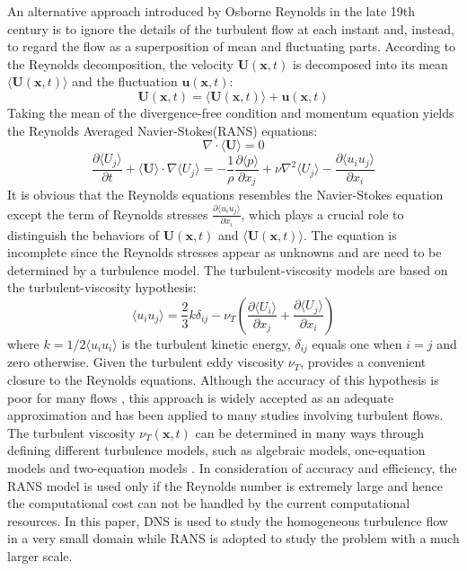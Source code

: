 An alternative approach introduced by Osborne Reynolds in the late 19th century is to ignore the details of the turbulent flow at each instant and, instead, to regard the flow as a superposition of mean and fluctuating parts. According to the Reynolds decomposition, the velocity $\mathbf{U}(\mathbf{x}, t)$ is decomposed into its mean $\langle\mathbf{U}(\mathbf{x},t)\rangle$ and the fluctuation $\mathbf{u}(\mathbf{x},t)$:
\begin{equation}
\mathbf{U}(\mathbf{x},t) = \langle\mathbf{U}(\mathbf{x},t)\rangle + \mathbf{u}(\mathbf{x},t)
\label{reynolds_decomp}
\end{equation}
Taking the mean of the divergence-free condition  and momentum equation  yields the Reynolds Averaged Navier-Stokes(RANS) equations:
\begin{equation}
\nabla\cdot\langle\mathbf{U}\rangle = 0
\label{div_free_U}
\end{equation}
\begin{equation}
\frac{\partial \langle U_j\rangle}{\partial t} + \langle \mathbf{U}\rangle
\cdot \nabla\langle U_j\rangle = 
- \frac{1}{\rho}\frac{\partial \langle p\rangle}{\partial x_j} + \nu\nabla^2\langle U_j\rangle - \frac{\partial\langle u_iu_j\rangle}{\partial x_i}
\label{reynolds_eqn}
\end{equation}
It is obvious that the Reynolds equations  resembles the Navier-Stokes equation  except the term of Reynolds stresses $\frac{\partial\langle u_iu_j\rangle}{\partial x_i}$, which plays a crucial role to distinguish the behaviors of $\mathbf{U}(\mathbf{x},t)$ and $\langle\mathbf{U}(\mathbf{x},t)\rangle$. The equation  is incomplete since the Reynolds stresses appear as unknowns and are need to be determined by a turbulence model. The turbulent-viscosity models are based on the turbulent-viscosity hypothesis: 
\begin{equation}
\langle u_iu_j\rangle = \frac{2}{3}k\delta_{ij} 
- \nu_T(\frac{\partial\langle U_i\rangle}{\partial x_j} + 
\frac{\partial\langle U_j\rangle}{\partial x_i})
\label{visc_hypo}
\end{equation}   
where $k = 1/2\langle u_iu_i\rangle$ is the turbulent kinetic energy, $\delta_{ij}$ equals one when $i = j$ and zero otherwise. Given the turbulent eddy viscosity $\nu_T$,  provides a convenient closure to the Reynolds equations. Although the accuracy of this hypothesis is poor for many flows \cite{PopeTurbulence2000}, this approach is widely accepted as an adequate approximation and has been applied to many studies involving turbulent flows. The turbulent viscosity $\nu_T(\mathbf{x},t)$ can be determined in many ways through defining different turbulence models, such as algebraic models, one-equation models and two-equation models \cite{WilcoxTurbulence2006}. In consideration of accuracy and efficiency, the RANS model is used only if the Reynolds number is extremely large and hence the computational cost can not be handled by the current computational resources. In this paper, DNS is used to study the homogeneous turbulence flow in a very small domain while RANS is adopted to study the problem with a much larger scale.   

